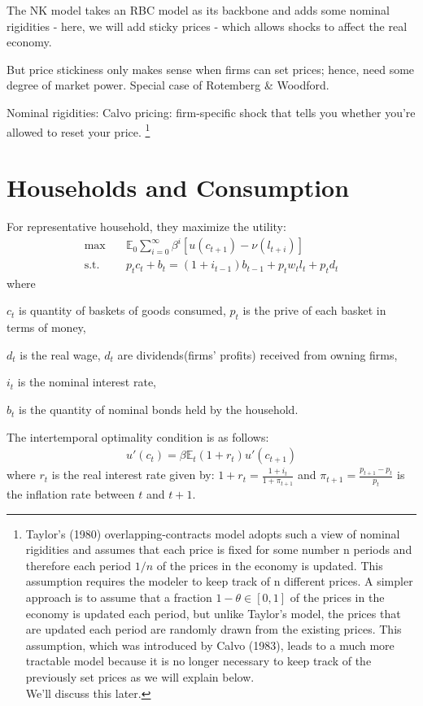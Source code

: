 The NK model takes an RBC model as its backbone and adds some nominal rigidities - 
here, we will add sticky prices - which allows shocks to affect the real economy.

But price stickiness only makes sense when ﬁrms can set prices;
hence, need some degree of market power. Special case of
Rotemberg \& Woodford.

Nominal rigidities: Calvo pricing: ﬁrm-speciﬁc shock that tells
you whether you're allowed to reset your price.
\footnote{Taylor's (1980) overlapping-contracts model adopts such a view of nominal
rigidities and assumes that each price is fixed for some number n periods and therefore each
period $1/n$ of the prices in the economy is updated. This assumption requires the modeler to
keep track of n different prices. A simpler approach is to assume that a fraction $1-\theta \in [0, 1]$
of the prices in the economy is updated each period, but unlike Taylor's model, the prices
that are updated each period are randomly drawn from the existing prices. This assumption,
which was introduced by Calvo (1983), leads to a much more tractable model because it is
no longer necessary to keep track of the previously set prices as we will explain below.\\
We'll discuss this later.}

\section{Households and Consumption}
For representative household, they maximize the utility:
\begin{align*}
    \max &\quad \mathbb{E}_0 \sum_{i=0}^\infty \beta^i \left[ u(c_{t+1}) - \nu(l_{t+i} ) \right] \\
    \text{s.t.} &\quad p_tc_t + b_t = (1+i_{t-1})b_{t-1} + p_t w_t l_t + p_t d_t
\end{align*}
where

$c_t$ is quantity of baskets of goods consumed, $p_t$ is the prive of each basket in terms of money,

$d_t$ is the real wage, $d_t$ are dividends(firms' profits) received from owning firms,

$i_t$ is the nominal interest rate, 

$b_t$ is the quantity of nominal bonds held by the household.

The intertemporal optimality condition is as follows:
\begin{align*}
    u'(c_t) = \beta \mathbb{E}_t(1+r_t)u'(c_{t+1})
\end{align*}
where $r_t$ is the real interest rate given by: $1 + r_t = \frac{1+i_t}{1+\pi_{t+1} }$
and $\pi_{t+1} = \frac{p_{t+1}-p_t}{p_t}$ is the inflation rate between $t$ and $t+1$.

